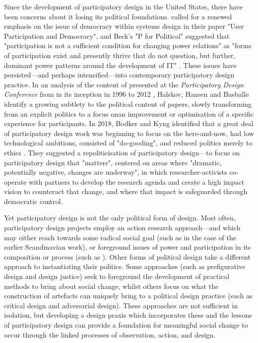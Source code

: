 Since the development of participatory design in the United States, there have been concerns about it losing its political foundations. \citet{bjerknes_user_1995} called for a renewed emphasis on the issue of democracy within systems design in their paper "User Participation and Democracy", and Beck's "P for Political" suggested that "participation is not a sufficient condition for changing power relations" as "forms of participation exist and presently thrive that do not question, but further, dominant power patterns around the development of IT" \citeyearpar[p. 82]{beck_p_2002}. These issues have persisted—and perhaps intensified—into contemporary participatory design practice. In an analysis of the content of presented at the \textit{Participatory Design Conference} from in its inception in 1996 to 2012 \citep{halskov_diversity_2015, basballe_early_2016}, Halskov, Hansen and Basballe identify a growing subtlety to the political content of papers, slowly transforming from an explicit politics to a focus onan improvement or optimisation of a specific experience for participants. In 2018, Bodker and Kyng identified that a great deal of participatory design work was beginning to focus on the here-and-now, had low technological ambitions, consisted of "do-gooding", and reduced politics merely to ethics \citep[p. 14]{bodker_participatory_2018}. They suggested a repoliticisation of participatory design—to focus on participatory design that "matters", centered on areas where "dramatic, potentially negative, changes are underway", in which researcher-activists co-operate with partners to develop the research agenda and create a high impact vision to counteract that change, and where that impact is safeguarded through democratic control. 

Yet participatory design is not the only political form of design. Most often, participatory design projects employ an action research approach—and which may either reach towards some radical social goal (such as in the case of the earlier Scandinavian work), or foreground issues of power and participation in its composition or process (such as \citet{vines_configuring_2013}). Other forms of political design take a different approach to instantiating their politics. Some approaches (such as prefigurative design and design justice) seek to foreground the development of practical methods to bring about social change, whilst others focus on what the construction of artefacts can uniquely bring to a political design practice (such as critical design and adversarial design).  These approaches are not sufficient in isolation, but developing a design praxis which incorporates these and the lessons of participatory design can provide a foundation for meaningful social change to occur through the linked processes of observation, action, and design.   

